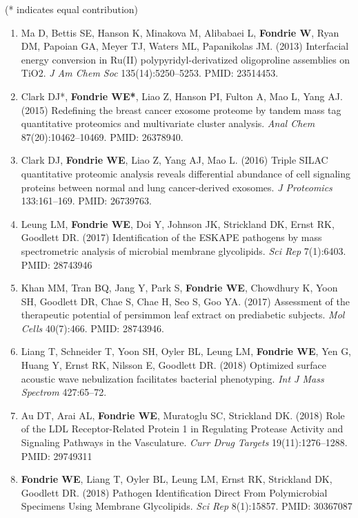 \documentclass{article}
\newcommand{\mysection}[1]{\vspace{1ex}{\bf #1}}
\begin{document}
\mysection{Refereed Publications} (* indicates equal contribution)
\begin{enumerate}
  \item Ma D, Bettis SE, Hanson K, Minakova M, Alibabaei L, {\bf Fondrie W}, Ryan DM, Papoian GA, Meyer TJ, Waters ML, Papanikolas JM. (2013) Interfacial energy conversion in Ru(II) polypyridyl-derivatized oligoproline assemblies on TiO2. \textit{J Am Chem Soc} 135(14):5250--5253. PMID: 23514453.

  \item Clark DJ*, {\bf Fondrie WE*}, Liao Z, Hanson PI, Fulton A, Mao L, Yang AJ. (2015) Redefining the breast cancer exosome proteome by tandem mass tag quantitative proteomics and multivariate cluster analysis. \textit{Anal Chem} 87(20):10462--10469. PMID: 26378940.

  \item Clark DJ, {\bf Fondrie WE}, Liao Z, Yang AJ, Mao L. (2016) Triple SILAC quantitative proteomic analysis reveals differential abundance of cell signaling proteins between normal and lung cancer-derived exosomes. {\it J Proteomics} 133:161--169. PMID: 26739763.

  \item Leung LM, {\bf Fondrie WE}, Doi Y, Johnson JK, Strickland DK, Ernst RK, Goodlett DR. (2017) Identification of the ESKAPE pathogens by mass spectrometric analysis of microbial membrane glycolipids. {\it Sci Rep} 7(1):6403. PMID: 28743946

  \item Khan MM, Tran BQ, Jang Y, Park S, {\bf Fondrie WE}, Chowdhury K, Yoon SH, Goodlett DR, Chae S, Chae H, Seo S, Goo YA. (2017) Assessment of the therapeutic potential of persimmon leaf extract on prediabetic subjects. {\it Mol Cells} 40(7):466. PMID: 28743946.

  \item Liang T, Schneider T, Yoon SH, Oyler BL, Leung LM, \textbf{Fondrie WE}, Yen G, Huang Y, Ernst RK, Nilsson E, Goodlett DR. (2018) Optimized surface acoustic wave nebulization facilitates bacterial phenotyping. \textit{Int J Mass Spectrom} 427:65--72.

  \item Au DT, Arai AL, \textbf{Fondrie WE}, Muratoglu SC, Strickland DK. (2018) Role of the LDL Receptor-Related Protein 1 in Regulating Protease Activity and Signaling Pathways in the Vasculature. \textit{Curr Drug Targets} 19(11):1276--1288. PMID: 29749311

  \item \textbf{Fondrie WE}, Liang T, Oyler BL, Leung LM, Ernst RK, Strickland DK, Goodlett DR. (2018) Pathogen Identification Direct From Polymicrobial Specimens Using Membrane Glycolipids. \textit{Sci Rep} 8(1):15857. PMID: 30367087


\end{enumerate}
\end{document}
